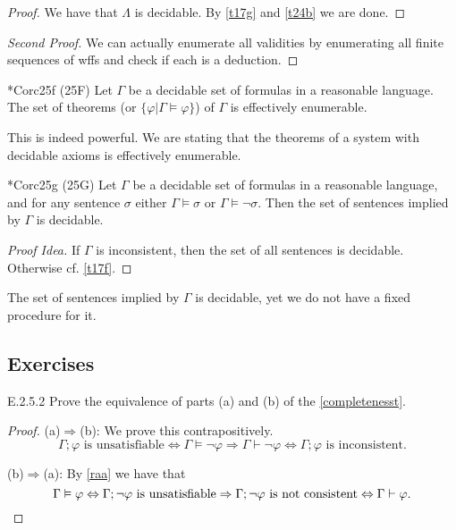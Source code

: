 \begin{proof}
  We have that $\Lambda$ is decidable. By \ref{t17g} and \ref{t24b} we are done.
\end{proof}

\begin{proof}[Second Proof]
  We can actually enumerate all validities by enumerating all finite sequences of wffs and check if each is a deduction.
\end{proof}

\begin{reference}{*Cor}{c25f}
  (25F) Let $\Gamma$ be a decidable set of formulas in a reasonable language. The set of theorems (or $\{\varphi|\Gamma\vDash \varphi\}$) of $\Gamma$ is effectively enumerable.
\end{reference}

This is indeed powerful. We are stating that the theorems of a system with decidable axioms is effectively enumerable.

\begin{reference}{*Cor}{c25g}
  (25G) Let $\Gamma$ be a decidable set of formulas in a reasonable language, and for any sentence $\sigma$ either $\Gamma\vDash \sigma$ or $\Gamma\vDash\neg \sigma$. Then the set of sentences implied by $\Gamma$ is decidable.
\end{reference}

\begin{proof}[Proof Idea]
  If $\Gamma$ is inconsistent, then the set of all sentences is decidable. Otherwise cf. \ref{t17f}.
\end{proof}

The set of sentences implied by $\Gamma$ is decidable, yet we do not have a fixed procedure for it.


\subsection*{Exercises}

\setcounter{exercise}{1}

\begin{exercise}{E.2.5.2}
  Prove the equivalence of parts (a) and (b) of the \ref{completenesst}.
\end{exercise}

\begin{proof}
  (a)$\Rightarrow$(b): We prove this contrapositively.
  \[
    \Gamma;\varphi\text{ is unsatisfiable}\Leftrightarrow\Gamma\vDash\neg \varphi\Rightarrow \Gamma\vdash \neg\varphi \Leftrightarrow \Gamma;\varphi\text{ is inconsistent}.
  \]

  (b)$\Rightarrow$(a): By \ref{raa} we have that
  \[
    \Gamma\vDash \varphi\Leftrightarrow \Gamma;\neg \varphi\text{ is unsatisfiable}\Rightarrow \Gamma;\neg \varphi\text{ is not consistent}\Leftrightarrow \Gamma\vdash \varphi.\qedhere
  \]
\end{proof}

